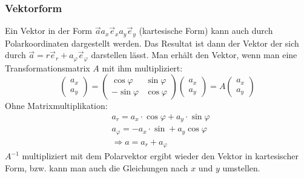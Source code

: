 \documentclass[a4paper,10pt]{scrartcl}
\begin{document}
        \subsubsection{Vektorform}
        Ein Vektor in der Form \(\vec{a} a_x\vec{e}_x a_y\vec{e}_y\) (kartesische Form) kann auch durch Polarkoordinaten dargestellt werden.
        Das Resultat ist dann der Vektor der sich durch \(\vec{a} = r\vec{e}_r + a_{\varphi}\vec{e}_{\varphi} \) darstellen lässt. Man erhält den
        Vektor, wenn man eine Transformationsmatrix \(A\) mit ihm multipliziert: 
        \begin{equation*}
            \begin{pmatrix} a_x \\ a_y \end{pmatrix} = \begin{pmatrix} \cos \varphi & \sin \varphi \\ 
                -\sin \varphi & \cos \varphi  \end{pmatrix} 
                \begin{pmatrix} a_x \\ a_y \end{pmatrix} = 
                A \begin{pmatrix} a_x \\ a_y \end{pmatrix}
        \end{equation*}
        Ohne Matrixmultiplikation: 
        \begin{equation*}
            \begin{aligned}
                & a_r = a_x \cdot \cos \varphi + a_y \cdot \sin \varphi \\
                & a_{\varphi} = -a_x \cdot \sin + a_y \cos \varphi \\
                & \Rightarrow a = a_r + a_{\varphi}
            \end{aligned}
        \end{equation*}
        \(A^{-1}\) multipliziert mit dem Polarvektor ergibt wieder den Vektor in kartesischer Form, bzw. kann man auch die Gleichungen nach \(x\) und 
        \(y\) umstellen.
\end{document}
